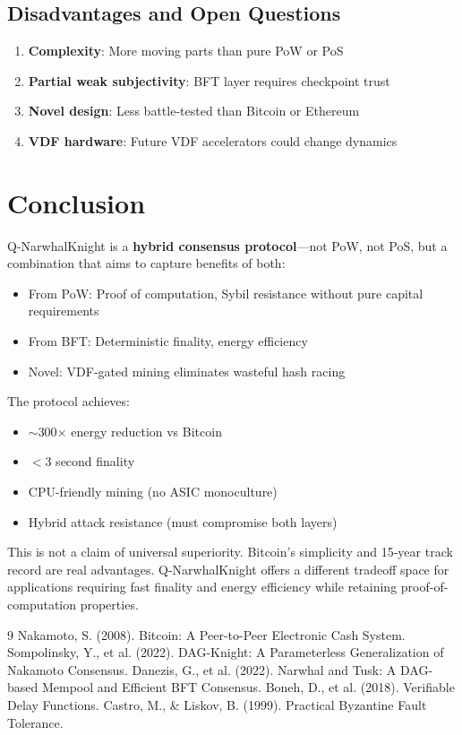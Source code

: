 \documentclass[11pt,a4paper]{article}
\begin{document}
\subsection{Disadvantages and Open Questions}

\begin{enumerate}
    \item \textbf{Complexity}: More moving parts than pure PoW or PoS
    \item \textbf{Partial weak subjectivity}: BFT layer requires checkpoint trust
    \item \textbf{Novel design}: Less battle-tested than Bitcoin or Ethereum
    \item \textbf{VDF hardware}: Future VDF accelerators could change dynamics
\end{enumerate}

\section{Conclusion}

Q-NarwhalKnight is a \textbf{hybrid consensus protocol}---not PoW, not PoS, but a combination that aims to capture benefits of both:

\begin{itemize}
    \item From PoW: Proof of computation, Sybil resistance without pure capital requirements
    \item From BFT: Deterministic finality, energy efficiency
    \item Novel: VDF-gated mining eliminates wasteful hash racing
\end{itemize}

The protocol achieves:
\begin{itemize}
    \item $\sim$300$\times$ energy reduction vs Bitcoin
    \item $<$3 second finality
    \item CPU-friendly mining (no ASIC monoculture)
    \item Hybrid attack resistance (must compromise both layers)
\end{itemize}

This is not a claim of universal superiority. Bitcoin's simplicity and 15-year track record are real advantages. Q-NarwhalKnight offers a different tradeoff space for applications requiring fast finality and energy efficiency while retaining proof-of-computation properties.

\begin{thebibliography}{9}
 Nakamoto, S. (2008). Bitcoin: A Peer-to-Peer Electronic Cash System.
 Sompolinsky, Y., et al. (2022). DAG-Knight: A Parameterless Generalization of Nakamoto Consensus.
 Danezis, G., et al. (2022). Narwhal and Tusk: A DAG-based Mempool and Efficient BFT Consensus.
 Boneh, D., et al. (2018). Verifiable Delay Functions.
 Castro, M., \& Liskov, B. (1999). Practical Byzantine Fault Tolerance.
\end{thebibliography}
\end{document}
